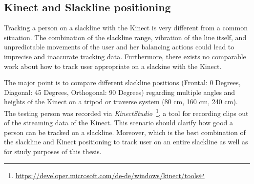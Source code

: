 \subsection{Kinect and Slackline positioning}\label{5_1_technicalFeasibility}
Tracking a person on a slackline with the Kinect is very different from a common situation.
The combination of the slackline range, vibration of the line itself, and unpredictable movements of the user and her balancing actions could lead to imprecise and inaccurate tracking data.
Furthermore, there exists no comparable work about how to track user appropriate on a slackine with the Kinect.

The major point is to compare different slackline positions (Frontal: 0 Degrees, Diagonal: 45 Degrees, Orthogonal: 90 Degrees) regarding multiple angles and heights of the Kinect on a tripod or traverse system (80 cm, 160 cm, 240 cm).
The testing person was recorded via \textit{KinectStudio}~\footnote{\url{https://developer.microsoft.com/de-de/windows/kinect/tools}}, a tool for recording clips out of the streaming data of the Kinect.
This scenario should clarify how good a person can be tracked on a slackline.
Moreover, which is the best combination of the slackline and Kinect positioning to track user on an entire slackline as well as for study purposes of this thesis.

